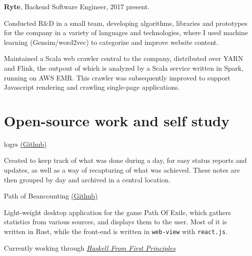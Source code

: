 \documentclass[a4paper]{article}
\renewenvironment{itemize}{
  \begin{list}{}{
    \setlength{\leftmargin}{1.5em}
  }
}{
  \end{list}
}
\newenvironment{packed}{
\begin{itemize}
  \setlength{\itemsep}{0pt}
  \setlength{\parskip}{0pt}
  \setlength{\parsep}{0pt}
}{\end{itemize}}
\begin{document}
\begin{itemize}
\item \textbf{Ryte}, Backend Software Engineer, 2017 {\textendash}
  present.
        \begin{itemize}
            \item Conducted R\&D in a small team, developing algorithms,
              libraries and prototypes for the company in a variety of languages
              and technologies, where I used machine learning (Gensim/word2vec)
              to categorize and improve website content.
            \item Maintained a Scala web crawler central to the company,
              distributed over YARN and Flink, the outpout of which is analyzed
              by a Scala service written in Spark, running on AWS EMR. This
              crawler was subsequently improved to support Javascript rendering
              and crawling single-page applications.
        \end{itemize}
\end{itemize}

\pagebreak
\section*{Open-source work and self study}

\begin{itemize}
  \item logrs \href{https://github.com/MordecaiMalignatus/logrs}{(Github)}
    \begin{packed}
      \item Created to keep track of what was done during a day, for easy status
        reports and updates, as well as a way of recapturing of what was
        achieved. These notes are then grouped by day and archived in a central
        location.
    \end{packed}
  \item{Path of Beancounting \href{https://github.com/MordecaiMalignatus/path-of-beancounting}{(Github)}}
    \begin{packed}
    \item Light-weight desktop application for the game Path Of Exile, which
      gathers statistics from various sources, and displays them to the
      user. Most of it is written in Rust, while the front-end is written in
      {\tt web-view} with {\tt react.js}.
    \end{packed}
  \item Currently working through \href{http://haskellbook.com}{\emph{Haskell From First Principles}}
\end{itemize}
\end{document}
